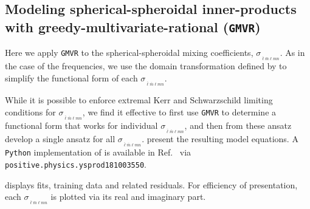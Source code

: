 \documentclass[twocolumn,aps,prd,floatfix,preprintnumbers,a4paper,nofootinbib,
superscriptaddress,10pt]{revtex4-1}
\def\LMlmn{_{\bar{\ell} \bar{m} \ell m n}}
\def\gmvr#1{greedy-multivariate-rational#1
  (\texttt{GMVR}#1)\gdef\gmvr{\texttt{GMVR}}}
\begin{document}
\subsection{Modeling spherical-spheroidal inner-products with \gmvr{}}
%
%
Here we apply \gmvr{} to the spherical-spheroidal mixing coefficients, $\sigma_{\LMlmn}$.
%
As in the case of the \qnm{} frequencies, we use the domain transformation defined by  to simplify the functional form of each $\sigma_{\LMlmn}$.
%
\par While it is possible to enforce extremal Kerr and Schwarzschild limiting conditions for $\sigma_{\LMlmn}$, we find it effective to first use \gmvr{} to determine a functional form that works for {individual} $\sigma_{\LMlmn}$, and then from these ansatz develop a single ansatz for all $\sigma_{\LMlmn}$.
%
 present the resulting model equations.
%
A \texttt{Python} implementation of  is available in Ref.~\cite{lionel_london_2018_1402516} via \texttt{positive.physics.ysprod181003550}.
%
%
\par {} displays fits, training data and related residuals.
%
For efficiency of presentation, each $\sigma_{\LMlmn}$ is plotted via its real and imaginary part.
%
\end{document}
